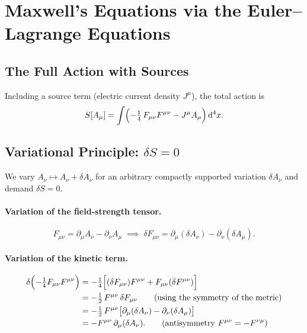 \documentclass[12pt, a4paper]{article}
\theoremstyle{plain}
\theoremstyle{definition}
\theoremstyle{remark}
\newcommand{\Action}{S}
\renewcommand{\d}{\mathrm{d}}
\begin{document}
\section{Maxwell's Equations via the Euler--Lagrange Equations}
\label{sec:euler}

\subsection{The Full Action with Sources}

Including a source term (electric current density $J^\mu$), the total action is
\begin{equation}
  \Action[A_\mu] = \int \Bigl(-\tfrac{1}{4}\,F_{\mu\nu}F^{\mu\nu} - J^\mu A_\mu\Bigr)\,\d^4x.
  \label{eq:action}
\end{equation}

\subsection{Variational Principle: $\delta S = 0$}

We vary $A_\nu \mapsto A_\nu + \delta A_\nu$ for an arbitrary compactly supported variation $\delta A_\nu$ and demand $\delta \Action = 0$.

\paragraph{Variation of the field-strength tensor.}
\[
  F_{\mu\nu} = \partial_\mu A_\nu - \partial_\nu A_\mu
  \;\implies\;
  \delta F_{\mu\nu} = \partial_\mu(\delta A_\nu) - \partial_\nu(\delta A_\mu).
\]

\paragraph{Variation of the kinetic term.}
\begin{align}
  \delta\Bigl(-\tfrac{1}{4}F_{\mu\nu}F^{\mu\nu}\Bigr)
  &= -\tfrac{1}{4}\Bigl[(\delta F_{\mu\nu})F^{\mu\nu} + F_{\mu\nu}(\delta F^{\mu\nu})\Bigr] \notag\\
  &= -\tfrac{1}{2}\,F^{\mu\nu}\,\delta F_{\mu\nu}
   \qquad\text{(using the symmetry of the metric)} \notag\\
  &= -\tfrac{1}{2}\,F^{\mu\nu}\bigl[\partial_\mu(\delta A_\nu) - \partial_\nu(\delta A_\mu)\bigr] \notag\\
  &= -F^{\mu\nu}\,\partial_\mu(\delta A_\nu).
   \qquad\text{(antisymmetry $F^{\mu\nu} = -F^{\nu\mu}$)}
  \label{eq:var_kinetic}
\end{align}
\end{document}
